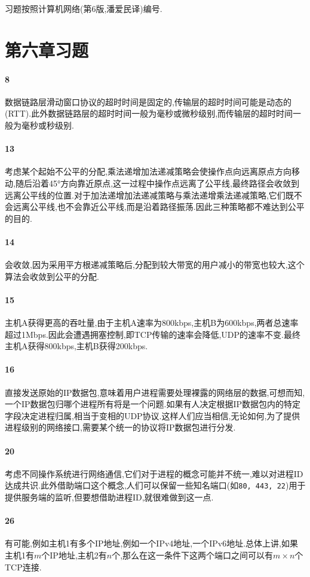 \documentclass[a4paper]{article}
\begin{document}
\courseheader
{}
习题按照计算机网络(第6版,潘爱民译)编号.
\section{第六章习题}
\paragraph{8}
数据链路层滑动窗口协议的超时时间是固定的,传输层的超时时间可能是动态的(RTT).此外数据链路层的超时时间一般为毫秒或微秒级别,而传输层的超时时间一般为毫秒或秒级别.
\paragraph{13}
考虑某个起始不公平的分配,乘法递增加法递减策略会使操作点向远离原点方向移动,随后沿着\ang{45}方向靠近原点,这一过程中操作点远离了公平线,最终路径会收敛到远离公平线的位置.对于加法递增加法递减策略与乘法递增乘法递减策略,它们既不会远离公平线,也不会靠近公平线,而是沿着路径振荡.因此三种策略都不难达到公平的目的.
\paragraph{14}
会收敛,因为采用平方根递减策略后,分配到较大带宽的用户减小的带宽也较大,这个算法会收敛到公平的分配.
\paragraph{15}
主机A获得更高的吞吐量,由于主机A速率为800kbps,主机B为600kbps,两者总速率超过1Mbps.因此会遭遇拥塞控制,即TCP传输的速率会降低,UDP的速率不变.最终主机A获得800kbps,主机B获得200kbps.
\paragraph{16}
直接发送原始的IP数据包,意味着用户进程需要处理裸露的网络层的数据,可想而知,一个IP数据包归哪个进程所有将是一个问题.如果有人决定根据IP数据包内的特定字段决定进程归属,相当于变相的UDP协议.这样人们应当相信,无论如何,为了提供进程级别的网络接口,需要某个统一的协议将IP数据包进行分发.
\paragraph{20}
考虑不同操作系统进行网络通信,它们对于进程的概念可能并不统一,难以对进程ID达成共识.此外借助端口这个概念,人们可以保留一些知名端口(如\verb|80, 443, 22|)用于提供服务端的监听,但要想借助进程ID,就很难做到这一点.
\paragraph{26}
有可能,例如主机1有多个IP地址,例如一个IPv4地址,一个IPv6地址.总体上讲,如果主机1有$m$个IP地址,主机2有$n$个,那么在这一条件下这两个端口之间可以有$m\times n$个TCP连接.
\end{document}
